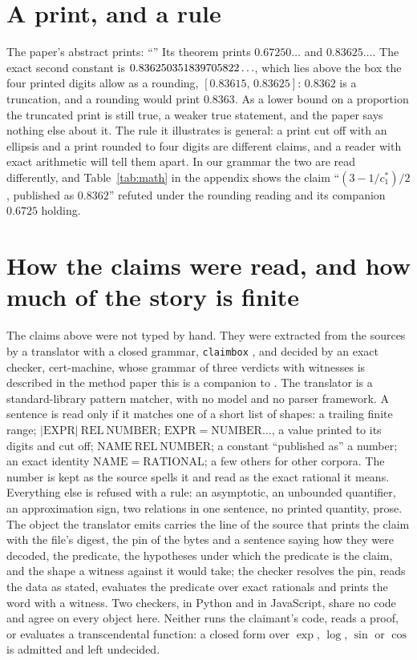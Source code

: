 \documentclass[preprint,11pt,authoryear,a4paper]{elsarticle}
\begin{document}
\section{A print, and a rule}\label{sec:print}

The paper's abstract prints: ``\RfAbstractSentence'' Its theorem prints $0.67250\ldots$ and $0.83625\ldots$. The exact second constant is $0.836250351839705822\ldots$, which lies above the box the four printed digits allow as a rounding, $[0.83615,\,0.83625]$: $0.8362$ is a truncation, and a rounding would print $0.8363$. As a lower bound on a proportion the truncated print is still true, a weaker true statement, and the paper says nothing else about it. The rule it illustrates is general: a print cut off with an ellipsis and a print rounded to four digits are different claims, and a reader with exact arithmetic will tell them apart. In our grammar the two are read differently, and Table~\ref{tab:math} in the appendix shows the claim ``$(3-1/c_1^*)/2$, published as $0.8362$'' refuted under the rounding reading and its companion $0.6725$ holding.

\section{How the claims were read, and how much of the story is finite}\label{sec:method}

The claims above were not typed by hand. They were extracted from the sources by a translator with a closed grammar, \texttt{claimbox} \citep{Claimbox}, and decided by an exact checker, cert-machine, whose grammar of three verdicts with witnesses is described in the method paper this is a companion to \citep[the method paper]{CMArchive}. The translator is a standard-library pattern matcher, with no model and no parser framework. A sentence is read only if it matches one of a short list of shapes: a trailing finite range; $|\mathrm{EXPR}|\ \mathrm{REL}\ \mathrm{NUMBER}$; $\mathrm{EXPR}=\mathrm{NUMBER}\ldots$, a value printed to its digits and cut off; $\mathrm{NAME}\ \mathrm{REL}\ \mathrm{NUMBER}$; a constant ``published as'' a number; an exact identity $\mathrm{NAME}=\mathrm{RATIONAL}$; a few others for other corpora. The number is kept as the source spells it and read as the exact rational it means. Everything else is refused with a rule: an asymptotic, an unbounded quantifier, an approximation sign, two relations in one sentence, no printed quantity, prose. The object the translator emits carries the line of the source that prints the claim with the file's digest, the pin of the bytes and a sentence saying how they were decoded, the predicate, the hypotheses under which the predicate is the claim, and the shape a witness against it would take; the checker resolves the pin, reads the data as stated, evaluates the predicate over exact rationals and prints the word with a witness. Two checkers, in Python and in JavaScript, share no code and agree on every object here. Neither runs the claimant's code, reads a proof, or evaluates a transcendental function: a closed form over $\exp$, $\log$, $\sin$ or $\cos$ is admitted and left undecided.
\end{document}
